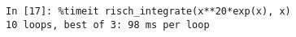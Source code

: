 ﻿\documentclass{article}
\begin{document}
\normalsize
\begin{Verbatim}
In [17]: %timeit risch_integrate(x**20*exp(x), x)
10 loops, best of 3: 98 ms per loop
\end{Verbatim}
\end{document}
